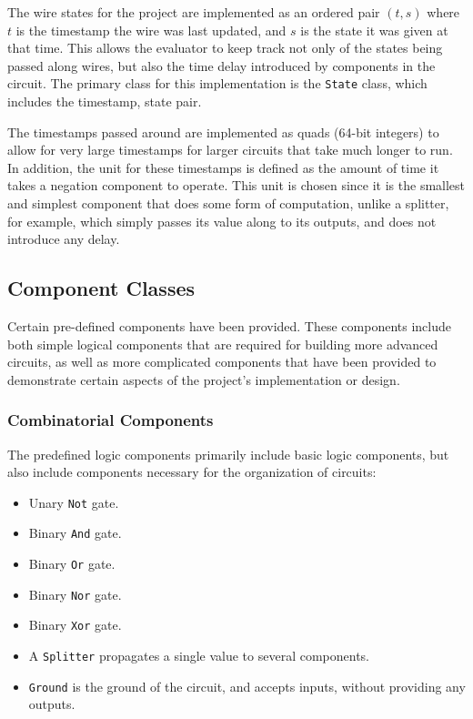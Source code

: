 \documentclass{article}
\newcommand{\ClassName}[1]{\texttt{#1}}
\begin{document}
The wire states for the project are implemented as an ordered pair $(t,s)$ where $t$ is the timestamp the wire was last updated, and $s$ is the state it was given at that time. This allows the evaluator to keep track not only of the states being passed along wires, but also the time delay introduced by components in the circuit. The primary class for this implementation is the \ClassName{State} class, which includes the timestamp, state pair.

The timestamps passed around are implemented as quads (64-bit integers) to allow for very large timestamps for larger circuits that take much longer to run. In addition, the unit for these timestamps is defined as the amount of time it takes a negation component to operate. This unit is chosen since it is the smallest and simplest component that does some form of computation, unlike a splitter, for example, which simply passes its value along to its outputs, and does not introduce any delay.

\subsection{Component Classes}

Certain pre-defined components have been provided. These components include both simple logical components that are required for building more advanced circuits, as well as more complicated components that have been provided to demonstrate certain aspects of the project's implementation or design.

\subsubsection{Combinatorial Components}

The predefined logic components primarily include basic logic components, but also include components necessary for the organization of circuits:

\begin{itemize}

\item Unary \ClassName{Not} gate.

\item Binary \ClassName{And} gate.

\item Binary \ClassName{Or} gate.

\item Binary \ClassName{Nor} gate.

\item Binary \ClassName{Xor} gate.

\item A \ClassName{Splitter} propagates a single value to several components.

\item \ClassName{Ground} is the ground of the circuit, and accepts inputs, without providing any outputs.

\end{itemize}
\end{document}
